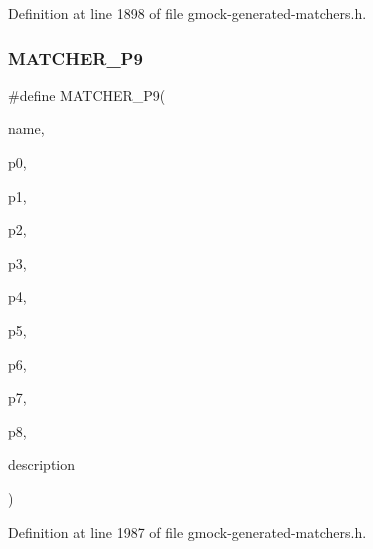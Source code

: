 Definition at line 1898 of file gmock-\/generated-\/matchers.\+h.

\mbox{\label{gmock-generated-matchers_8h_a2dc1db146d4112c9fde1c2708807e43e}} 
\subsubsection{\texorpdfstring{M\+A\+T\+C\+H\+E\+R\+\_\+\+P9}{MATCHER\_P9}}
{\footnotesize\ttfamily \#define M\+A\+T\+C\+H\+E\+R\+\_\+\+P9(\begin{DoxyParamCaption}\item[{}]{name,  }\item[{}]{p0,  }\item[{}]{p1,  }\item[{}]{p2,  }\item[{}]{p3,  }\item[{}]{p4,  }\item[{}]{p5,  }\item[{}]{p6,  }\item[{}]{p7,  }\item[{}]{p8,  }\item[{}]{description }\end{DoxyParamCaption})}



Definition at line 1987 of file gmock-\/generated-\/matchers.\+h.

